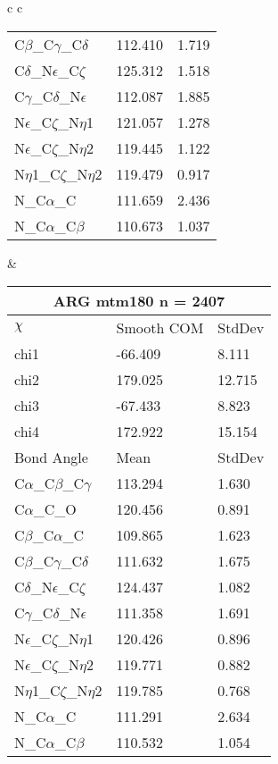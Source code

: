 \begin{longtable}{ c c }
\begin{tabular}{ l l l }
  C$\beta$\_C$\gamma$\_C$\delta$ & 112.410 & 1.719\\
  C$\delta$\_N$\epsilon$\_C$\zeta$ & 125.312 & 1.518\\
  C$\gamma$\_C$\delta$\_N$\epsilon$ & 112.087 & 1.885\\
  N$\epsilon$\_C$\zeta$\_N$\eta$1 & 121.057 & 1.278\\
  N$\epsilon$\_C$\zeta$\_N$\eta$2 & 119.445 & 1.122\\
  N$\eta$1\_C$\zeta$\_N$\eta$2 & 119.479 & 0.917\\
  N\_C$\alpha$\_C & 111.659 & 2.436\\
  N\_C$\alpha$\_C$\beta$ & 110.673 & 1.037\\
  \bottomrule
  \end{tabular}
  &
  \begin{tabular}{ l l l }
  \toprule
  \multicolumn{3}{c}{ARG \textbf{mtm180} n = 2407} \\ \toprule
  $\chi$       & Smooth COM & StdDev \\ \midrule
  chi1 & -66.409 & 8.111 \\ 
  chi2 & 179.025 & 12.715 \\ 
  chi3 & -67.433 & 8.823 \\ 
  chi4 & 172.922 & 15.154 \\ \midrule
  Bond Angle   & Mean     & StdDev \\ \midrule
  C$\alpha$\_C$\beta$\_C$\gamma$ & 113.294 & 1.630\\
  C$\alpha$\_C\_O & 120.456 & 0.891\\
  C$\beta$\_C$\alpha$\_C & 109.865 & 1.623\\
  C$\beta$\_C$\gamma$\_C$\delta$ & 111.632 & 1.675\\
  C$\delta$\_N$\epsilon$\_C$\zeta$ & 124.437 & 1.082\\
  C$\gamma$\_C$\delta$\_N$\epsilon$ & 111.358 & 1.691\\
  N$\epsilon$\_C$\zeta$\_N$\eta$1 & 120.426 & 0.896\\
  N$\epsilon$\_C$\zeta$\_N$\eta$2 & 119.771 & 0.882\\
  N$\eta$1\_C$\zeta$\_N$\eta$2 & 119.785 & 0.768\\
  N\_C$\alpha$\_C & 111.291 & 2.634\\
  N\_C$\alpha$\_C$\beta$ & 110.532 & 1.054\\
  \bottomrule
  \end{tabular}
  \\
  \begin{tabular}{ l l l }

\end{tabular}
\end{longtable}

